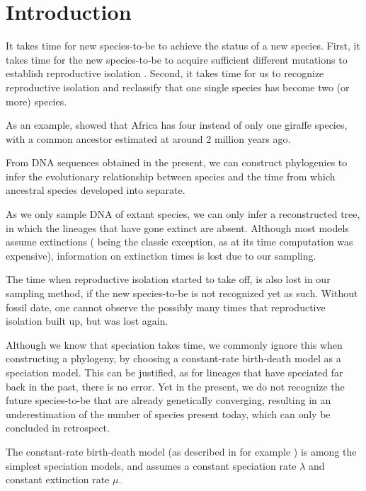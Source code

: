 \section{Introduction}


It takes time for new species-to-be to achieve the status of a new species.
First, it takes time for the new species-to-be 
to acquire sufficient different mutations to 
establish reproductive isolation \cite{schluter2001ecology}. Second, 
it takes time for us to recognize reproductive isolation
and reclassify that one single species has become two 
(or more) species. 


As an example, \cite{fennessy2016multi} 
showed that Africa has four instead of only one
giraffe species, with a common ancestor estimated 
at around 2 million years ago.


From DNA sequences obtained in the present, we can construct phylogenies
to infer the evolutionary relationship between species and the time 
from which ancestral species developed into separate.
  
As we only sample DNA of extant species, 
we can only infer a reconstructed tree, in which
the lineages that have gone extinct are absent.
Although most models assume extinctions (\cite{yule1925mathematical} being the
classic exception, as at its time computation was expensive), 
information on extinction times is lost due to our sampling.


The time when reproductive isolation started to take off, is
also lost in our sampling method, if the new species-to-be is not 
recognized yet as such. Without fossil date, one cannot observe the
possibly many times that reproductive isolation built up, but was lost again.


Although we know that speciation takes time, we commonly ignore this when
constructing a phylogeny, by choosing a constant-rate birth-death model
as a speciation model. This can be justified, as for lineages 
that have speciated far back in the past, there is no error. 
Yet in the present, we do not recognize the future species-to-be
that are already genetically converging, resulting in an underestimation
of the number of species present today, which can only be 
concluded in retrospect.

The constant-rate birth-death model (as described in for example \cite{nee1994reconstructed}) 
is among the simplest speciation models, and assumes a constant speciation
 rate $\lambda$ and constant extinction rate $\mu$.


